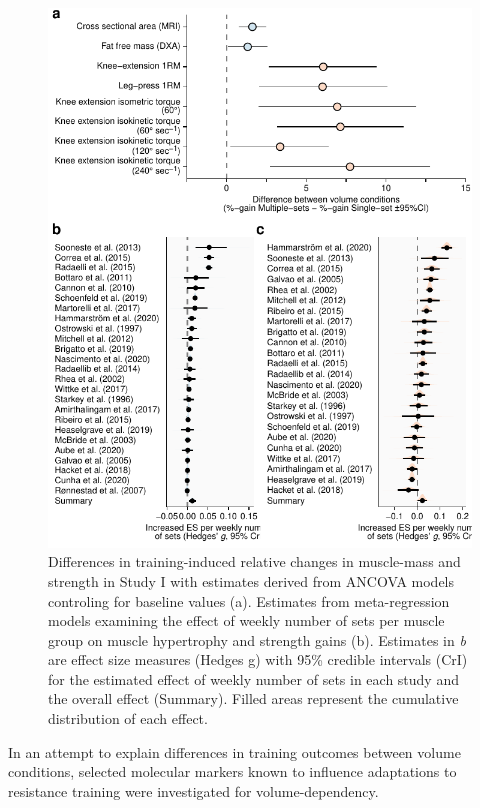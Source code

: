 \documentclass[twoside,10pt]{gihclass} %
\begin{document}
\begin{figure}

{\centering \includegraphics{thesis_files/figure-latex/comb-fig-s1-1} 

}

\caption[Differences in training induced changes to muscle mass and strength measures between volume conditions in Study I and weekly training volume meta-regression.]{Differences in training-induced relative changes in muscle-mass and strength in Study I with estimates derived from ANCOVA models controling for baseline values (a). Estimates from meta-regression models examining the effect of weekly number of sets per muscle group on muscle hypertrophy and strength gains (b). Estimates in \textit{b} are effect size measures (Hedges g) with 95\% credible intervals (CrI) for the estimated effect of weekly number of sets in each study and the overall effect (Summary). Filled areas represent the cumulative distribution of each effect.}\label{fig:comb-fig-s1}
\end{figure}
In an attempt to explain differences in training outcomes between volume conditions, selected molecular markers known to influence adaptations to resistance training were investigated for volume-dependency.
\end{document}
